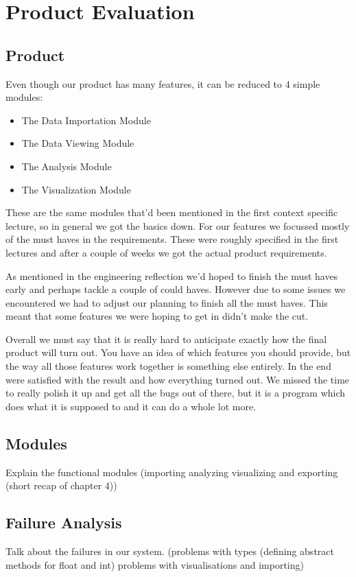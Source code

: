 \chapter{Product Evaluation} %

\section{Product}
Even though our product has many features, it can be reduced to 4 simple modules:
\begin{itemize}
	\item The Data Importation Module
	\item The Data Viewing Module
	\item The Analysis Module
	\item The Visualization Module
\end{itemize}
These are the same modules that'd been mentioned in the first context specific lecture, so in general we got the basics down. For our features we focussed mostly of the must haves in the requirements. These were roughly specified in the first lectures and after a couple of weeks we got the actual product requirements.

As mentioned in the engineering reflection we'd hoped to finish the must haves early and perhaps tackle a couple of could haves. However due to some issues we encountered we had to adjust our planning to finish all the must haves. This meant that some features we were hoping to get in didn't make the cut.

Overall we must say that it is really hard to anticipate exactly how the final product will turn out. You have an idea of which features you should provide, but the way all those features work together is something else entirely. In the end were satisfied with the result and how everything turned out. We missed the time to really polish it up and get all the bugs out of there, but it is a program which does what it is supposed to and it can do a whole lot more.

\section{Modules}


Explain the functional modules (importing analyzing visualizing and exporting (short recap of chapter 4))

\section{Failure Analysis}
Talk about the failures in our system. (problems with types (defining abstract methods for float and int) problems with visualisations and importing)